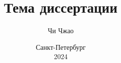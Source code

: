 \documentclass[hidelinks,fontsize=14pt,paper=a4,pagesize,DIV=calc,noenddot]{gost}
\author{Чи Чжао}
\date{Санкт-Петербург\\ 2024}
\title{Тема диссертации}
\begin{document}
\maketitlepage

\tableofcontents













\end{document}
